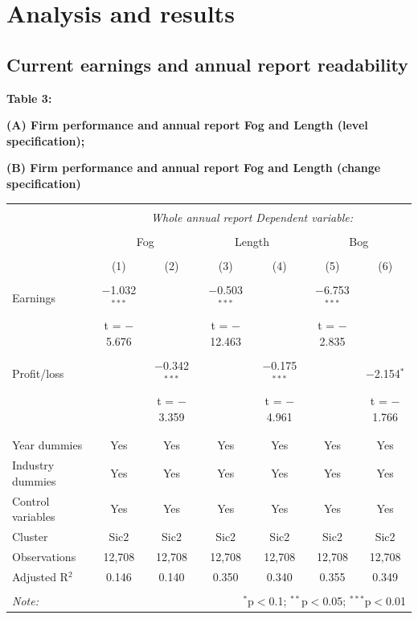 \documentclass[a4paper]{article}
\begin{document}
\section{Analysis and results}
\subsection{Current earnings and annual report readability}

{\normalsize \textbf{Table 3: } \par}
{\normalsize \textbf{(A) Firm performance and annual report Fog and Length (level specification); } \par}
{\normalsize \textbf{(B) Firm performance and annual report Fog and Length (change specification)} \par}

\begin{tabular}{@{\extracolsep{5pt}}lcccccc} 
\\[-1.8ex]\hline 
\hline \\[-1.8ex] 
 & \multicolumn{6}{c}{\textit{Whole annual report Dependent variable:}} \\ 
\cline{2-7} 
\\[-1.8ex] & \multicolumn{2}{c}{Fog} & \multicolumn{2}{c}{Length} & \multicolumn{2}{c}{Bog} \\ 
\\[-1.8ex] & (1) & (2) & (3) & (4) & (5) & (6)\\ 
\hline \\[-1.8ex] 
 Earnings & $-$1.032$^{***}$ &  & $-$0.503$^{***}$ &  & $-$6.753$^{***}$ &  \\ 
  & t = $-$5.676 &  & t = $-$12.463 &  & t = $-$2.835 &  \\ 
  & & & & & & \\ 
 Profit/loss &  & $-$0.342$^{***}$ &  & $-$0.175$^{***}$ &  & $-$2.154$^{*}$ \\ 
  &  & t = $-$3.359 &  & t = $-$4.961 &  & t = $-$1.766 \\ 
  & & & & & & \\ 
\hline \\[-1.8ex] 
Year dummies & Yes & Yes & Yes & Yes & Yes & Yes \\ 
Industry dummies & Yes & Yes & Yes & Yes & Yes & Yes \\ 
Control variables & Yes & Yes & Yes & Yes & Yes & Yes \\ 
Cluster & Sic2 & Sic2 & Sic2 & Sic2 & Sic2 & Sic2 \\ 
Observations & 12,708 & 12,708 & 12,708 & 12,708 & 12,708 & 12,708 \\ 
Adjusted R$^{2}$ & 0.146 & 0.140 & 0.350 & 0.340 & 0.355 & 0.349 \\ 
\hline 
\hline \\[-1.8ex] 
\textit{Note:}  & \multicolumn{6}{r}{$^{*}$p$<$0.1; $^{**}$p$<$0.05; $^{***}$p$<$0.01} \\ 
\end{tabular} 
\end{document}
